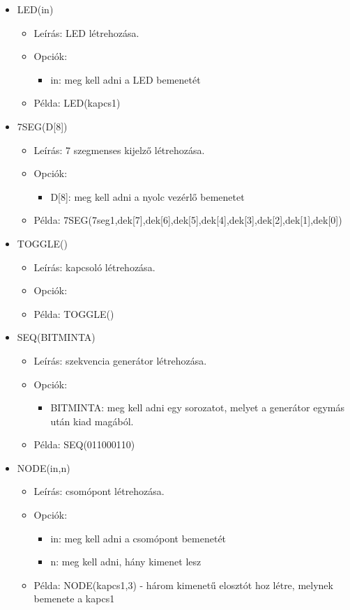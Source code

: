 \begin{itemize}
\item LED(in)
	\begin{itemize}
	\item Leírás: LED létrehozása.
	\item Opciók: 
		\begin{itemize}
			\item in: meg kell adni a LED bemenetét
		\end{itemize}
	\item Példa: LED(kapcs1)
	\end{itemize}

\item 7SEG(D[8])
	\begin{itemize}
	\item Leírás: 7 szegmenses kijelző létrehozása.
	\item Opciók: 
		\begin{itemize}
			\item D[8]: meg kell adni a nyolc vezérlő bemenetet
		\end{itemize}
	\item Példa: 7SEG(7seg1,dek[7],dek[6],dek[5],dek[4],dek[3],dek[2],dek[1],dek[0])
	\end{itemize}
	
\item TOGGLE()
	\begin{itemize}
	\item Leírás: kapcsoló létrehozása.
	\item Opciók: 
	\item Példa: TOGGLE()
	\end{itemize}		

\item SEQ(BITMINTA)
	\begin{itemize}
	\item Leírás: szekvencia generátor létrehozása.
	\item Opciók: 
		\begin{itemize}
			\item BITMINTA: meg kell adni egy sorozatot, melyet a generátor egymás után kiad magából.
		\end{itemize}
	\item Példa: SEQ(011000110)
	\end{itemize}

\item NODE(in,n)
	\begin{itemize}
	\item Leírás: csomópont létrehozása.
	\item Opciók: 
		\begin{itemize}
			\item in: meg kell adni a csomópont bemenetét
			\item n: meg kell adni, hány kimenet lesz
		\end{itemize}
	\item Példa: NODE(kapcs1,3) - három kimenetű elosztót hoz létre, melynek bemenete a kapcs1
	\end{itemize}
	

\end{itemize}
